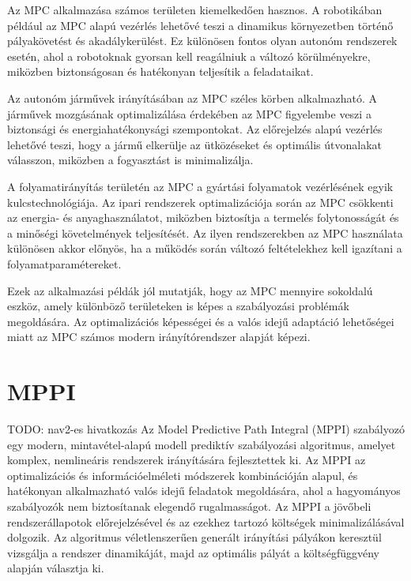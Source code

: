Az MPC alkalmazása számos területen kiemelkedően hasznos. A robotikában például az MPC alapú vezérlés lehetővé teszi a dinamikus környezetben történő pályakövetést és akadálykerülést. Ez különösen fontos olyan autonóm rendszerek esetén, ahol a robotoknak gyorsan kell reagálniuk a változó körülményekre, miközben biztonságosan és hatékonyan teljesítik a feladataikat.

Az autonóm járművek irányításában az MPC széles körben alkalmazható. A járművek mozgásának optimalizálása érdekében az MPC figyelembe veszi a biztonsági és energiahatékonysági szempontokat. Az előrejelzés alapú vezérlés lehetővé teszi, hogy a jármű elkerülje az ütközéseket és optimális útvonalakat válasszon, miközben a fogyasztást is minimalizálja.

A folyamatirányítás területén az MPC a gyártási folyamatok vezérlésének egyik kulcstechnológiája. Az ipari rendszerek optimalizációja során az MPC csökkenti az energia- és anyaghasználatot, miközben biztosítja a termelés folytonosságát és a minőségi követelmények teljesítését. Az ilyen rendszerekben az MPC használata különösen akkor előnyös, ha a működés során változó feltételekhez kell igazítani a folyamatparamétereket.

Ezek az alkalmazási példák jól mutatják, hogy az MPC mennyire sokoldalú eszköz, amely különböző területeken is képes a szabályozási problémák megoldására. Az optimalizációs képességei és a valós idejű adaptáció lehetőségei miatt az MPC számos modern irányítórendszer alapját képezi.

\section{MPPI}
TODO: nav2-es hivatkozás
Az Model Predictive Path Integral (MPPI) szabályozó egy modern, mintavétel-alapú modell prediktív szabályozási algoritmus, amelyet komplex, nemlineáris rendszerek irányítására fejlesztettek ki. Az MPPI az optimalizációs és információelméleti módszerek kombinációján alapul, és hatékonyan alkalmazható valós idejű feladatok megoldására, ahol a hagyományos szabályozók nem biztosítanak elegendő rugalmasságot. Az MPPI a jövőbeli rendszerállapotok előrejelzésével és az ezekhez tartozó költségek minimalizálásával dolgozik. Az algoritmus véletlenszerűen generált irányítási pályákon keresztül vizsgálja a rendszer dinamikáját, majd az optimális pályát a költségfüggvény alapján választja ki.

